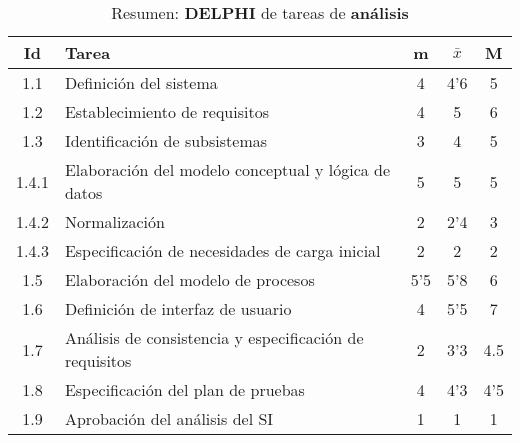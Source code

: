 \documentclass[11pt,a4paper,spanish,twoside]{report}
\begin{document}
\begin{table}[!h]
\centering
  \begin{tabular}{|c||p{8cm}||c|c|c|}
    \hline
    \textbf{Id} & \textbf{Tarea} & \textbf{m} & 
    \textbf{$\bar{x}$} &\textbf{M} \\
    \hline \hline
    1.1 & Definición del sistema & 4 & 4'6 & 5\\ 
    \hline
    1.2 & Establecimiento de requisitos & 4 & 5 & 6\\
    \hline
    1.3 & Identificación de subsistemas & 3 & 4 & 5\\
    \hline
    1.4.1 & Elaboración del modelo conceptual y lógica de datos & 5 & 5 & 5\\
    \hline
    1.4.2 & Normalización & 2 & 2'4 & 3 \\
    \hline
    1.4.3 & Especificación de necesidades de carga inicial & 2 & 2 & 2\\
    \hline
    1.5 & Elaboración del modelo de procesos & 5'5 & 5'8 & 6\\
    \hline
    1.6 & Definición de interfaz de usuario & 4 & 5'5 & 7\\
    \hline
    1.7 & Análisis de consistencia y especificación de requisitos & 2 & 3'3 &
    4.5\\
    \hline
    1.8 & Especificación del plan de pruebas & 4 & 4'3 & 4'5\\
    \hline
    1.9 & Aprobación del análisis del SI & 1 & 1 & 1\\
    \hline
  \end{tabular}
  \caption{Resumen: \textbf{DELPHI} de tareas de \textbf{análisis}}
  \label{Tab:rDELPHIana}
\end{table}
\end{document}
